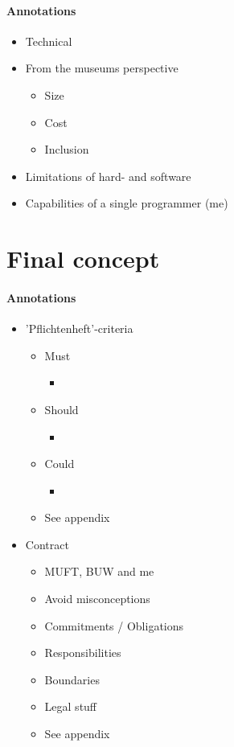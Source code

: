 \paragraph{Annotations}

\begin{itemize}
	\item Technical
	\item From the museums perspective
	\begin{itemize}
		\item Size
		\item Cost
		\item Inclusion
	\end{itemize}
	\item Limitations of hard- and software
	\item Capabilities of a single programmer (me)
\end{itemize}


\section{Final concept}
\label{conception_final}

\paragraph{Annotations}

\begin{itemize}
	\item 'Pflichtenheft'-criteria
	\begin{itemize}
		\item Must
		\begin{itemize}
			\item 
		\end{itemize}
		\item Should
		\begin{itemize}
			\item 
		\end{itemize}
		\item Could
		\begin{itemize}
			\item 
		\end{itemize}
		\item See appendix
	\end{itemize}
	\item Contract 
		\begin{itemize}
			\item MUFT, BUW and me
			\item Avoid misconceptions
			\item Commitments / Obligations
			\item Responsibilities
			\item Boundaries
			\item Legal stuff
			\item See appendix
		\end{itemize}
\end{itemize}

